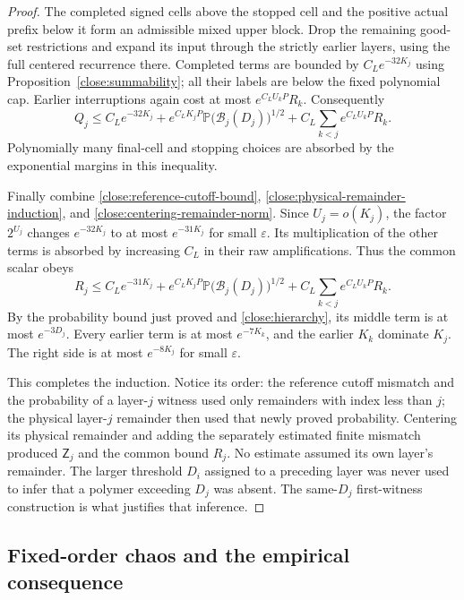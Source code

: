 \begin{proof}
The completed signed cells above the stopped cell and the
positive actual prefix below it form an admissible mixed upper
block. Drop the remaining good-set restrictions and expand its
input through the strictly earlier layers, using the full
centered recurrence there. Completed terms are bounded by
$C_L e^{-32K_j}$ using
Proposition~\ref{close:summability}; all their labels are below
the fixed polynomial cap. Earlier interruptions again cost at
most $e^{C_LU_kP}R_k$. Consequently
\begin{equation}\label{close:physical-remainder-induction}
 Q_j\leq C_L e^{-32K_j}
 +e^{C_LK_jP}
       \mathbb P\bigl(\mathcal B_j(D_j)\bigr)^{1/2}
 +C_L\sum_{k<j}e^{C_LU_kP}R_k.
\end{equation}
Polynomially many final-cell and stopping choices are absorbed
by the exponential margins in this inequality.

Finally combine \eqref{close:reference-cutoff-bound},
\eqref{close:physical-remainder-induction}, and
\eqref{close:centering-remainder-norm}. Since $U_j=o(K_j)$,
the factor $2^{U_j}$ changes $e^{-32K_j}$ to at most
$e^{-31K_j}$ for small $\varepsilon$. Its multiplication of
the other terms is absorbed by increasing $C_L$ in their raw
amplifications. Thus the common scalar obeys
\begin{equation}\label{close:remainder-induction}
 R_j\leq C_L e^{-31K_j}
 +e^{C_LK_jP}
       \mathbb P\bigl(\mathcal B_j(D_j)\bigr)^{1/2}
 +C_L\sum_{k<j}e^{C_LU_kP}R_k.
\end{equation}
By the probability bound just proved and
\eqref{close:hierarchy}, its middle term is at most
$e^{-3D_j}$. Every earlier term is at most
$e^{-7K_k}$, and the earlier $K_k$ dominate $K_j$. The right
side is at most $e^{-8K_j}$ for small $\varepsilon$.

This completes the induction. Notice its order: the reference
cutoff mismatch and the probability of a layer-$j$ witness used
only remainders with index less than $j$; the physical
layer-$j$ remainder then used that newly proved probability.
Centering its physical remainder and adding the separately
estimated finite mismatch produced $\mathsf Z_j$ and the common
bound $R_j$. No estimate assumed its own layer's remainder.
The larger threshold $D_i$ assigned to a preceding
layer was never used to infer that a polymer exceeding $D_j$
was absent. The same-$D_j$ first-witness construction is what
justifies that inference.
\end{proof}

\subsection{Fixed-order chaos and the empirical consequence}

